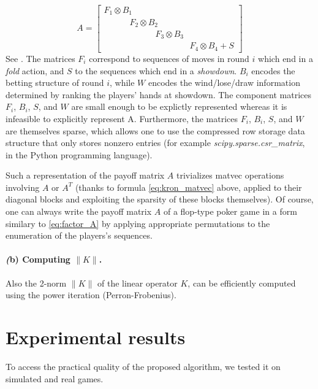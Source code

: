 \documentclass{article} %
\begin{document}
\begin{equation}
  A = \begin{bmatrix}F_1 \otimes B_1\hspace{10em}\\\hspace{3em}F_2
    \otimes B_2\hspace{7em}\\\hspace{6em}F_3 \otimes
    B_3\hspace{4em}\\\hspace{10em}F_4 \otimes B_4 + S \end{bmatrix}
\label{eq:factor_A}
\end{equation}
See \cite{hoda2010smoothing}. The matrices $F_i$ correspond to
sequences of moves in round $i$ which end in a \textit{fold} action,
and $S$ to the sequences which end in a \textit{showdown}. $B_i$
encodes the betting structure of round $i$, while $W$ encodes the
wind/lose/draw information determined by ranking the players' hands at
showdown. The component matrices $F_i$, $B_i$, $S$, and $W$ are small
enough to be explictly represented whereas it is infeasible to
explicitly represent A. Furthermore, the matrices $F_i$, $B_i$,
$S$, and $W$ are themselves sparse, which allows one to use the
compressed row storage data structure that only stores nonzero entries
(for example \textit{scipy.sparse.csr\_matrix}, in the Python
programming language).

Such a representation of the payoff matrix $A$ trivializes matvec
operations involving $A$ or $A^T$ (thanks to formula
\eqref{eq:kron_matvec} above, applied to their diagonal blocks and
exploiting the sparsity of these blocks themselves). Of course, one
can always write the payoff matrix $A$ of a flop-type poker game in a
form similary to \eqref{eq:factor_A} by applying appropriate
permutations to the enumeration of the players's sequences.

\paragraph{\textit(b) Computing $\|K\|$.}
Also the 2-norm $\|K\|$ of the linear operator $K$, can be efficiently
computed using the power iteration (Perron-Frobenius).

\section{Experimental results}
\label{sec:results}
To access the practical quality of the proposed algorithm, we
tested it on simulated and real games.
\end{document}
